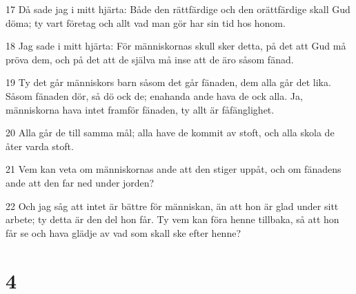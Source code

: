 \par 17 Då sade jag i mitt hjärta: Både den rättfärdige och den orättfärdige skall Gud döma; ty vart företag och allt vad man gör har sin tid hos honom.
\par 18 Jag sade i mitt hjärta: För människornas skull sker detta, på det att Gud må pröva dem, och på det att de själva må inse att de äro såsom fänad.
\par 19 Ty det går människors barn såsom det går fänaden, dem alla går det lika. Såsom fänaden dör, så dö ock de; enahanda ande hava de ock alla. Ja, människorna hava intet framför fänaden, ty allt är fåfänglighet.
\par 20 Alla går de till samma mål; alla have de kommit av stoft, och alla skola de åter varda stoft.
\par 21 Vem kan veta om människornas ande att den stiger uppåt, och om fänadens ande att den far ned under jorden?
\par 22 Och jag såg att intet är bättre för människan, än att hon är glad under sitt arbete; ty detta är den del hon får. Ty vem kan föra henne tillbaka, så att hon får se och hava glädje av vad som skall ske efter henne?

\chapter{4}

